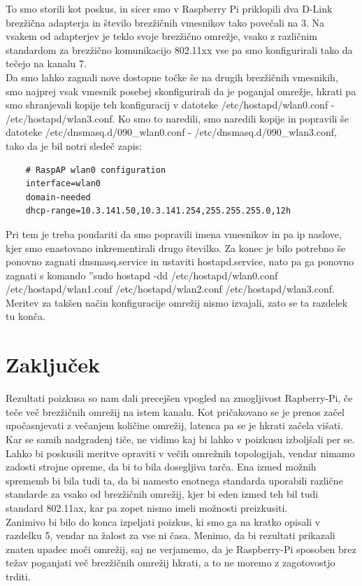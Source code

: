 \documentclass[11pt,a4paper,slovene]{article}
\begin{document}
To smo storili kot poskus, in sicer smo v Raspberry Pi priklopili dva D-Link brezžična adapterja in število brezžičnih vmesnikov tako povečali na 3. Na vsakem od adapterjev je teklo svoje brezžično omrežje, vsako z različnim standardom za brezžično komunikacijo 802.11xx vse pa smo konfigurirali tako da tečejo na kanalu 7.\\
Da smo lahko zagnali nove dostopne točke še na drugih brezžičnih vmesnikih, smo najprej vsak vmesnik posebej skonfigurirali da je poganjal omrežje, hkrati pa smo shranjevali kopije teh konfiguracij v datoteke /etc/hostapd/wlan0.conf - /etc/hostapd/wlan3.conf. Ko smo to naredili, smo naredili kopije in popravili še datoteke /etc/dnsmasq.d/090\_wlan0.conf - /etc/dnsmasq.d/090\_wlan3.conf, tako da je bil notri sledeč zapis:
\begin{verbatim}
	# RaspAP wlan0 configuration
	interface=wlan0
	domain-needed
	dhcp-range=10.3.141.50,10.3.141.254,255.255.255.0,12h
\end{verbatim}
Pri tem je treba poudariti da smo popravili imena vmesnikov in pa ip naslove, kjer smo enastovano inkrementirali drugo številko. Za konec je bilo potrebno še ponovno zagnati dnsmasq.service in ustaviti hostapd.service, nato pa ga ponovno zagnati s komando ''sudo hostapd -dd /etc/hostapd/wlan0.conf /etc/hostapd/wlan1.conf /etc/hostapd/wlan2.conf /etc/hostapd/wlan3.conf.\\
Meritev za takšen način konfiguracije omrežij nismo izvajali, zato se ta razdelek tu konča.

\section{Zaključek}
Rezultati poizkusa so nam dali precejšen vpogled na zmogljivost Rapberry-Pi, če teče več brezžičnih omrežij na istem kanalu. Kot pričakovano se je prenos začel upočasnjevati z večanjem količine omrežij, latenca pa se je hkrati začela višati. Kar se samih nadgradenj tiče, ne vidimo kaj bi lahko v poizkusu izboljšali per se. Lahko bi poskusili meritve opraviti v večih omrežnih topologijah, vendar nimamo zadosti strojne opreme, da bi to bila dosegljiva tarča. Ena izmed možnih sprememb bi bila tudi ta, da bi namesto enotnega standarda uporabili različne standarde za vsako od brezžičnih omrežij, kjer bi eden izmed teh bil tudi standard 802.11ax, kar pa zopet nismo imeli možnosti preizkusiti.\\
Zanimivo bi bilo do konca izpeljati poizkus, ki smo ga na kratko opisali v razdelku 5, vendar na žalost za vse ni časa. Menimo, da bi rezultati prikazali znaten upadec moči omrežij, saj ne verjamemo, da je Raspberry-Pi sposoben brez težav poganjati več brezžičnih omrežij hkrati, a to ne moremo z zagotovostjo trditi.
\end{document}
